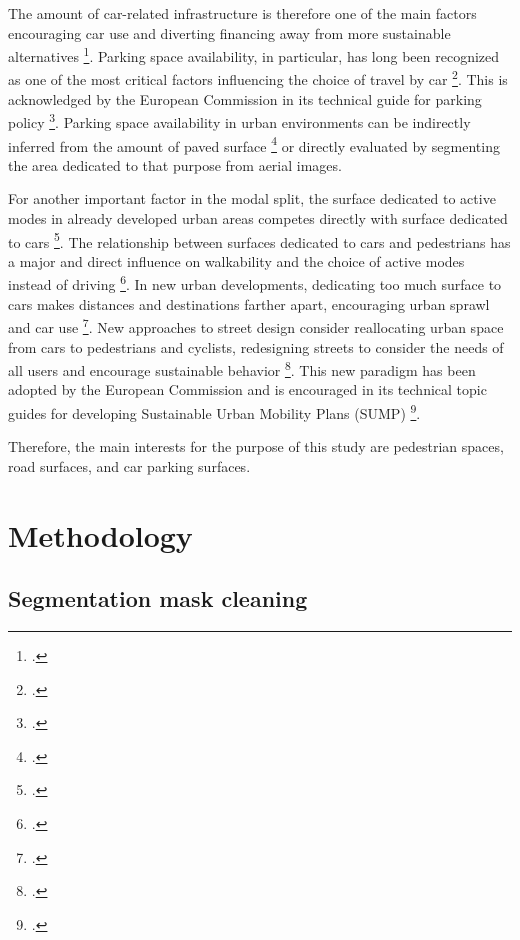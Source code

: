 \begin{refsection}
The amount of car-related infrastructure is therefore one of the main factors encouraging car use and diverting financing away from more sustainable alternatives \footcite{mattioli_political_2020}. Parking space availability, in particular, has long been recognized as one of the most critical factors influencing the choice of travel by car \footcite{feeney_review_1989, christiansen_parking_2017, mccahill_effects_2016, pandhe_parking_2012}. This is acknowledged by the European Commission in its technical guide for parking policy \footcite{tom_rye_parking_2022}. Parking space availability in urban environments can be indirectly inferred from the amount of paved surface \footcite{litman_why_2011} or directly evaluated by segmenting the area dedicated to that purpose from aerial images.


For another important factor in the modal split, the surface dedicated to active modes in already developed urban areas competes directly with surface dedicated to cars \footcite{gerike_built_2021}. The relationship between surfaces dedicated to cars and pedestrians has a major and direct influence on walkability and the choice of active modes instead of driving \footcite{gerike_built_2021}. In new urban developments, dedicating too much surface to cars makes distances and destinations farther apart, encouraging urban sprawl and car use \footcite{alshammari_compactness_2022, glaeser_chapter_2004}. New approaches to street design consider reallocating urban space from cars to pedestrians and cyclists, redesigning streets to consider the needs of all users and encourage sustainable behavior \footcite{halpern_road_2022, rodriguez-valencia_understanding_2021, schroter_guidance_2021}. This new paradigm has been adopted by the European Commission and is encouraged in its technical topic guides for developing Sustainable Urban Mobility Plans (SUMP) \footcite{fabian_kuster_practitioner_2019, jim_walker_supporting_2019}.


Therefore, the main interests for the purpose of this study are pedestrian spaces, road surfaces, and car parking surfaces.

\renewcommand{\sectionnametext}{Methodology}
\renewcommand{\headingtextR}{\thesection. \sectionnametext}
\section{\sectionnametext}

\subsection{Segmentation mask cleaning}


\end{refsection}
